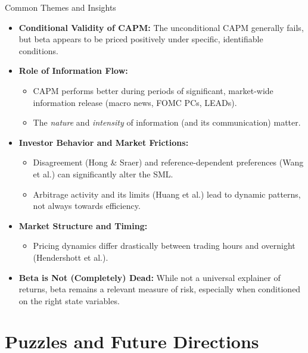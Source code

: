 \documentclass[10pt]{beamer}
\begin{document}
\begin{frame}{Common Themes and Insights}
  \begin{itemize}
    \item \textbf{Conditional Validity of CAPM:} The unconditional CAPM generally fails, but beta appears to be priced positively under specific, identifiable conditions.
    \item \textbf{Role of Information Flow:}
    \begin{itemize}
        \item CAPM performs better during periods of significant, market-wide information release (macro news, FOMC PCs, LEADs).
        \item The \textit{nature} and \textit{intensity} of information (and its communication) matter.
    \end{itemize}
    \item \textbf{Investor Behavior and Market Frictions:}
    \begin{itemize}
        \item Disagreement (Hong \& Sraer) and reference-dependent preferences (Wang et al.) can significantly alter the SML.
        \item Arbitrage activity and its limits (Huang et al.) lead to dynamic patterns, not always towards efficiency.
    \end{itemize}
    \item \textbf{Market Structure and Timing:}
    \begin{itemize}
        \item Pricing dynamics differ drastically between trading hours and overnight (Hendershott et al.).
    \end{itemize}
    \item \textbf{Beta is Not (Completely) Dead:} While not a universal explainer of returns, beta remains a relevant measure of risk, especially when conditioned on the right state variables.
  \end{itemize}
\end{frame}

\section{Puzzles and Future Directions}
\end{document}
